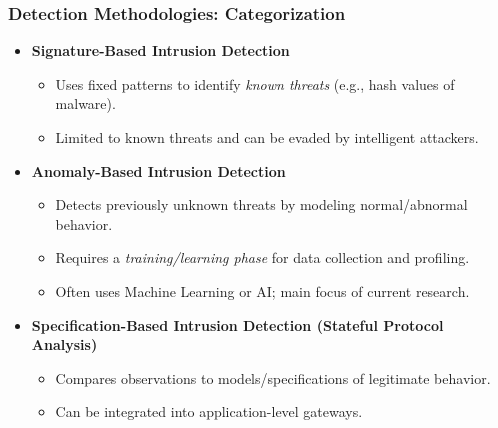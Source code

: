 \subsubsection{Detection Methodologies: Categorization}
\begin{itemize}
    \item \textbf{Signature-Based Intrusion Detection}
    \begin{itemize}
        \item Uses fixed patterns to identify \textit{known threats} (e.g., hash values of malware).
        \item Limited to known threats and can be evaded by intelligent attackers.
    \end{itemize}
    \item \textbf{Anomaly-Based Intrusion Detection}
    \begin{itemize}
        \item Detects previously unknown threats by modeling normal/abnormal behavior.
        \item Requires a \textit{training/learning phase} for data collection and profiling.
        \item Often uses Machine Learning or AI; main focus of current research.
    \end{itemize}
    \item \textbf{Specification-Based Intrusion Detection (Stateful Protocol Analysis)}
    \begin{itemize}
        \item Compares observations to models/specifications of legitimate behavior.
        \item Can be integrated into application-level gateways.
    \end{itemize}
\end{itemize}

